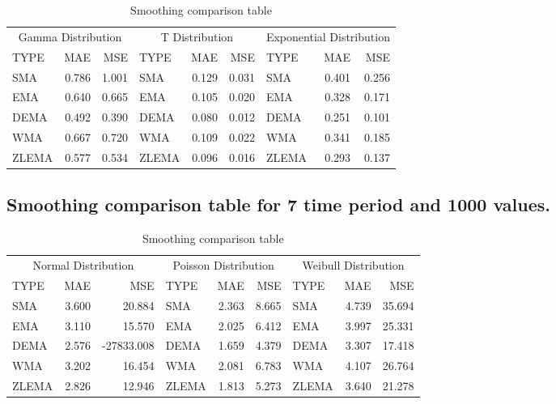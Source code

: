 \documentclass{article}
\begin{document}
\begin{table}[H]

\caption{\label{tab:unnamed-chunk-12}Smoothing comparison table}
\centering
\begin{tabular}[t]{lrrlrrlrr}
\toprule
\multicolumn{3}{c}{Gamma Distribution} & \multicolumn{3}{c}{T Distribution} & \multicolumn{3}{c}{Exponential Distribution} \\
\cmidrule(l{3pt}r{3pt}){1-3} \cmidrule(l{3pt}r{3pt}){4-6} \cmidrule(l{3pt}r{3pt}){7-9}
TYPE & MAE & MSE & TYPE & MAE & MSE & TYPE & MAE & MSE\\
\midrule
SMA & 0.786 & 1.001 & SMA & 0.129 & 0.031 & SMA & 0.401 & 0.256\\
EMA & 0.640 & 0.665 & EMA & 0.105 & 0.020 & EMA & 0.328 & 0.171\\
DEMA & 0.492 & 0.390 & DEMA & 0.080 & 0.012 & DEMA & 0.251 & 0.101\\
WMA & 0.667 & 0.720 & WMA & 0.109 & 0.022 & WMA & 0.341 & 0.185\\
ZLEMA & 0.577 & 0.534 & ZLEMA & 0.096 & 0.016 & ZLEMA & 0.293 & 0.137\\
\bottomrule
\end{tabular}
\end{table}

\hypertarget{smoothing-comparison-table-for-7-time-period-and-1000-values.}{%
\subsection{Smoothing comparison table for 7 time period and 1000
values.}\label{smoothing-comparison-table-for-7-time-period-and-1000-values.}}

\begin{table}[H]

\caption{\label{tab:unnamed-chunk-13}Smoothing comparison table}
\centering
\begin{tabular}[t]{lrrlrrlrr}
\toprule
\multicolumn{3}{c}{Normal Distribution} & \multicolumn{3}{c}{Poisson Distribution} & \multicolumn{3}{c}{Weibull Distribution} \\
\cmidrule(l{3pt}r{3pt}){1-3} \cmidrule(l{3pt}r{3pt}){4-6} \cmidrule(l{3pt}r{3pt}){7-9}
TYPE & MAE & MSE & TYPE & MAE & MSE & TYPE & MAE & MSE\\
\midrule
SMA & 3.600 & 20.884 & SMA & 2.363 & 8.665 & SMA & 4.739 & 35.694\\
EMA & 3.110 & 15.570 & EMA & 2.025 & 6.412 & EMA & 3.997 & 25.331\\
DEMA & 2.576 & -27833.008 & DEMA & 1.659 & 4.379 & DEMA & 3.307 & 17.418\\
WMA & 3.202 & 16.454 & WMA & 2.081 & 6.783 & WMA & 4.107 & 26.764\\
ZLEMA & 2.826 & 12.946 & ZLEMA & 1.813 & 5.273 & ZLEMA & 3.640 & 21.278\\
\bottomrule
\end{tabular}
\end{table}
\end{document}
